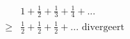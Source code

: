 \documentclass[preview]{standalone}
\begin{document}
\begin{align*}
&1+\frac{1}{2}+\frac{1}{3}+\frac{1}{4}+...\\\geq&\frac{1}{2}+\frac{1}{2}+\frac{1}{2}+...\text{ divergeert}
\end{align*}
\end{document}
